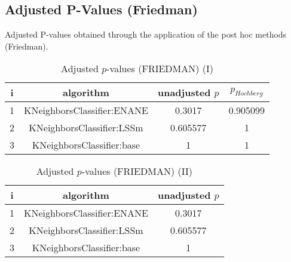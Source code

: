 \documentclass[a4paper,10pt]{article}
\begin{document}
\begin{landscape}
\section{Adjusted P-Values (Friedman)}


Adjusted P-values obtained through the application of the post hoc methods (Friedman).

\begin{table}[!htp]
\centering\small
\begin{tabular}{cccc}
i&algorithm&unadjusted $p$&$p_{Hochberg}$\\
\hline1&KNeighborsClassifier:ENANE&0.3017&0.905099\\2&KNeighborsClassifier:LSSm&0.605577&1\\3&KNeighborsClassifier:base&1&1\\\hline
\end{tabular}
\caption{Adjusted $p$-values (FRIEDMAN) (I)}
\end{table}
\begin{table}[!htp]
\centering\small
\begin{tabular}{ccc}
i&algorithm&unadjusted $p$\\
\hline1&KNeighborsClassifier:ENANE&0.3017\\2&KNeighborsClassifier:LSSm&0.605577\\3&KNeighborsClassifier:base&1\\\hline
\end{tabular}
\caption{Adjusted $p$-values (FRIEDMAN) (II)}
\end{table}

\newpage
\end{landscape}
\end{document}
